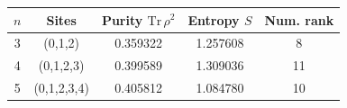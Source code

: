 \begin{tabular}{cccc c}
\toprule
$n$ & Sites & Purity $\mathrm{Tr}\,\rho^2$ & Entropy $S$ & Num. rank \\
\midrule
3 & (0,1,2) & 0.359322 & 1.257608 & 8 \\
4 & (0,1,2,3) & 0.399589 & 1.309036 & 11 \\
5 & (0,1,2,3,4) & 0.405812 & 1.084780 & 10 \\
\bottomrule
\end{tabular}